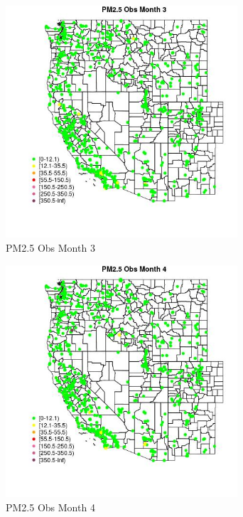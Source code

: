 \begin{figure} 
\centering  
\includegraphics[width=0.77\textwidth]{Code_Outputs/Report_ML_input_PM25_Step4_part_f_de_duplicated_aves_prioritize_24hr_obswNAs_MapObsMo3PM25_Obs.jpg} 
\caption{\label{fig:Report_ML_input_PM25_Step4_part_f_de_duplicated_aves_prioritize_24hr_obswNAsMapObsMo3PM25_Obs}PM2.5 Obs Month 3} 
\end{figure} 
 

\begin{figure} 
\centering  
\includegraphics[width=0.77\textwidth]{Code_Outputs/Report_ML_input_PM25_Step4_part_f_de_duplicated_aves_prioritize_24hr_obswNAs_MapObsMo4PM25_Obs.jpg} 
\caption{\label{fig:Report_ML_input_PM25_Step4_part_f_de_duplicated_aves_prioritize_24hr_obswNAsMapObsMo4PM25_Obs}PM2.5 Obs Month 4} 
\end{figure} 
 

